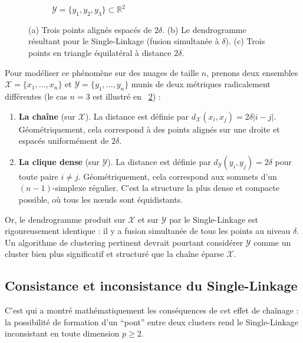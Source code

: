 \begin{figure}[!ht]
\begin{subfigure}[b]{0.3\textwidth}
        \caption{$\mathcal Y = \bigl\{y_1,y_2,y_3\bigr\} \subset \mathbb R^2$\label{fig:triangle_equilateral}}
    \end{subfigure}
    
    \caption{(a) Trois points alignés espacés de $2\delta$. (b) Le dendrogramme résultant pour le Single-Linkage (fusion simultanée à $\delta$). (c) Trois points en triangle équilatéral à distance $2\delta$. %
    }
    \label{fig:chaining_effect}
\end{figure}

Pour modéliser ce phénomène sur des nuages de taille $n$, prenons deux ensembles $\mathcal X = \{x_1, \dots, x_n\}$ et $\mathcal Y = \{y_1, \dots, y_n\}$ munis de deux métriques radicalement différentes (le cas $n=3$ est illustré en \Fig~\ref{fig:chaining_effect}) :
\begin{enumerate}
\item \textbf{La chaîne} (sur $\mathcal X$). La distance est définie par $d_{\mathcal X}(x_i, x_j) = 2\delta|i-j|$. Géométriquement, cela correspond à des points alignés sur une droite et espacés uniformément de $2\delta$.
\item \textbf{La clique dense} (sur $\mathcal Y$). La distance est définie par $d_{\mathcal Y}(y_i,y_j) = 2\delta$ pour toute paire $i \neq j$. Géométriquement, cela correspond aux sommets d'un $(n{-}1)$-simplexe régulier. C'est la structure la plus dense et compacte possible, où tous les nœuds sont équidistants.
\end{enumerate} 

Or, le dendrogramme produit sur $\mathcal{X}$ et sur $\mathcal{Y}$ par le Single-Linkage est rigoureusement identique : il y a fusion simultanée de tous les points au niveau $\delta$. Un algorithme de clustering pertinent devrait pourtant considérer $\mathcal Y$ comme un cluster bien plus significatif et structuré que la chaîne éparse $\mathcal X$.

\subsection{Consistance et inconsistance du Single-Linkage}
C'est  \cite{hartigan81} qui a montré mathématiquement les conséquences de cet effet de chaînage : la possibilité de formation d'un ``pont'' entre deux clusters rend le Single-Linkage inconsistant en toute dimension $p \ge 2$.

